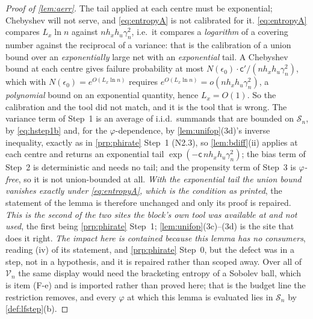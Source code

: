 \begin{proof}[Proof of \cref{lem:aerr}]
The tail applied at each centre must be exponential; Chebyshev will not serve, and
\eqref{eq:entropyA} is not calibrated for it. \eqref{eq:entropyA} compares
$L_x\ln n$ against $nh_xh_u\gamma_n^{2}$, i.e.\ it compares a \emph{logarithm} of a covering number
against the reciprocal of a variance: that is the calibration of a union bound over an
\emph{exponentially} large net with an \emph{exponential} tail. A Chebyshev bound at each centre gives
failure probability at most $N(\epsilon_0)\cdot\mathsf c'/(nh_xh_u\gamma_n^{2})$, which with
$N(\epsilon_0)=e^{O(L_x\ln n)}$ requires $e^{O(L_x\ln n)}=o(nh_xh_u\gamma_n^{2})$, a
\emph{polynomial} bound on an exponential quantity, hence $L_x=O(1)$. So the calibration and the
tool did not match, and it is the tool that is wrong. The variance term of Step~1 is an average of
i.i.d.\ summands that are bounded on $\mathcal S_n$, by \eqref{eq:hstep1b} and, for the
$\varphi$-dependence, by \cref{lem:unifop}(3d)'s inverse inequality, exactly as in \cref{prp:phirate}
Step~1 (N2.3), so \cref{lem:bdiff}(ii) applies at each centre and returns an exponential tail
$\exp(-\mathsf c\,nh_xh_u\gamma_n^{2})$; the bias term of Step~2 is deterministic and needs no tail; and
the propensity term of Step~3 is \emph{$\varphi$-free}, so it is not union-bounded at all. \emph{With the
exponential tail the union bound vanishes exactly under \eqref{eq:entropyA}, which is the condition as
printed}, the statement of the lemma is therefore unchanged and only its proof is repaired.
\emph{This is the second of the two sites the block's own tool was available at and not used}, the first
being \cref{prp:phirate} Step~1; \cref{lem:unifop}(3c)--(3d) is the site that does it right. \emph{The
impact here is contained because this lemma has no consumers}, reading (iv) of its statement, and
\cref{prp:phirate} Step~0, but the defect was in a step, not in a hypothesis, and it is repaired
rather than scoped away.
Over all of $\mathcal V_n$ the same display would need the bracketing entropy of a Sobolev ball,
which is item (F-e) and is imported rather than proved here; that is the budget line the restriction
removes, and every
$\varphi$ at which this lemma is evaluated lies in $\mathcal S_n$ by \cref{def:lfstep}(b).


\end{proof}

